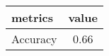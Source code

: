 \begin{tabular}{|l|c|}
\hline
 metrics &  value \\ \hline

Accuracy &   0.66 \\ \hline

\end{tabular}
